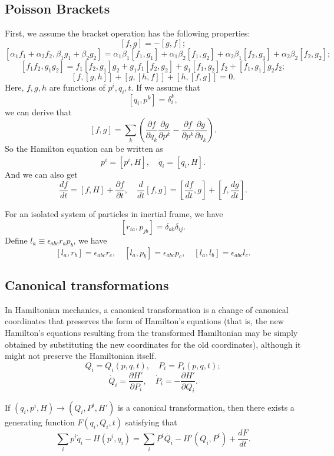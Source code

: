\subsection{Poisson Brackets}
First, we assume the bracket operation has the following properties:
\[ \left[f,g\right]=-\left[g,f\right] ;\]
\[\left[\alpha_1 f_1+\alpha_2 f_2,\beta_1 g_1+\beta_2 g_2\right]=\alpha_1 \beta_1\left[f_1,g_1\right]
+\alpha_1 \beta_2\left[f_1,g_2\right]+\alpha_2 \beta_1\left[f_2,g_1\right]+\alpha_2 \beta_2\left[f_2,g_2\right];\]
\[\left[f_1 f_2,g_1 g_2\right]=f_1\left[f_2,g_1\right]g_2+g_1 f_1\left[f_2,g_2\right]+g_1\left[f_1,g_2\right]f_2 +\left[f_1,g_1\right]g_2 f_2 ;\]
\[\left[f,\left[g,h\right]\right]+\left[g,\left[h,f\right]\right]+\left[h,\left[f,g\right]\right]=0.\]
Here, $f,g,h$ are functions of $p^i,q_i,t$.
If we assume that
\[\left [q_i,p^k\right ]=\delta^{k}_{i},\]
we can derive that 
\[ \left[f,g\right]=\sum_k(\frac{\partial f}{\partial q_k} \frac{\partial g}{\partial p^k} - \frac{\partial f}{\partial p^k} \frac{\partial g}{\partial q_k}  ).\]
So the Hamilton equation can be written as
\[\dot{p^i}=\left[ p^i,H \right] , \quad \dot{q_i}=\left[ q_i,H \right].\]
And we can also get
\[\frac{df}{dt} = [f,H] + \frac{\partial f}{\partial t}, \quad \frac{d}{dt} [f,g] = [\frac{df}{dt},g] + [f,\frac{dg}{dt}].\]
\begin{example}
For an isolated system of particles in inertial frame, we have
\[[r_{ia},p_{jb}] = \delta_{ab} \delta_{ij}.\]
Define $l_a \equiv \epsilon_{abc} r_{a} p_{b}$, we have
\[[l_a,r_b] = \epsilon_{abc}r_c ,\quad [l_a,p_b] = \epsilon_{abc}p_c ,\quad [l_a,l_b] = \epsilon_{abc}l_c.\]
\end{example}

\subsection{Canonical transformations}
In Hamiltonian mechanics, a canonical transformation is a change of canonical coordinates that preserves the form of Hamilton's equations (that is, the new Hamilton's equations resulting from the transformed Hamiltonian may be simply obtained by substituting the new coordinates for the old coordinates), although it might not preserve the Hamiltonian itself. 
\[Q_i = Q_i(p,q,t) ,\quad P_i=P_i(p,q,t);\]
\[\dot{Q}_i = \frac{\partial H'}{\partial P_i} ,\quad \dot{P}_i = -\frac{\partial H'}{\partial Q_i}.\]

\begin{newprop}
If $(q_i,p^i,H) \to (Q_i,P^i,H')$ is a canonical transformation, then there exists a generating function $F(q_i,Q_i,t)$ satisfying that
\[\sum_i p^i\dot{q}_i-H(p^i,q_i) = \sum_i P^i\dot{Q_i} - H'(Q_i,P^i) + \frac{dF}{dt}.\]
\end{newprop}

